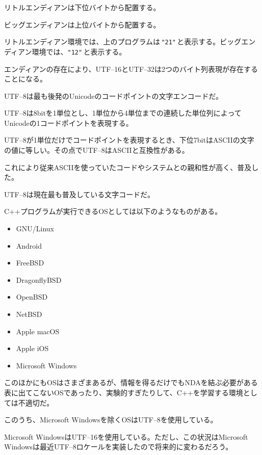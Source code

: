 リトルエンディアンは下位バイトから配置する。

ビッグエンディアンは上位バイトから配置する。

リトルエンディアン環境では、上のプログラムは\,\texttt{"21"}\,と表示する。ビッグエンディアン環境では、\texttt{"12"}\,と表示する。

エンディアンの存在により、UTF--16とUTF--32は2つのバイト列表現が存在することになる。


UTF--8は最も後発のUnicodeのコードポイントの文字エンコードだ。

UTF--8は8bitを1単位とし、1単位から4単位までの連続した単位列によってUnicodeの1コードポイントを表現する。

UTF--8が1単位だけでコードポイントを表現するとき、下位7bitはASCIIの文字の値に等しい。その点でUTF--8はASCIIと互換性がある。

これにより従来ASCIIを使っていたコードやシステムとの親和性が高く、普及した。

UTF--8は現在最も普及している文字コードだ。


C++プログラムが実行できるOSとしては以下のようなものがある。

\begin{itemize}
\item
  GNU/Linux
\item
  Android
\item
  FreeBSD
\item
  DragonflyBSD
\item
  OpenBSD
\item
  NetBSD
\item
  Apple macOS
\item
  Apple iOS
\item
  Microsoft Windows
\end{itemize}

このほかにもOSはさまざまあるが、情報を得るだけでもNDAを結ぶ必要がある表に出てこないOSであったり、実験的すぎたりして、C++を学習する環境としては不適切だ。

このうち、Microsoft Windowsを除くOSはUTF--8を使用している。

Microsoft WindowsはUTF--16を使用している。ただし、この状況はMicrosoft Windowsは最近UTF--8ロケールを実装したので将来的に変わるだろう。



